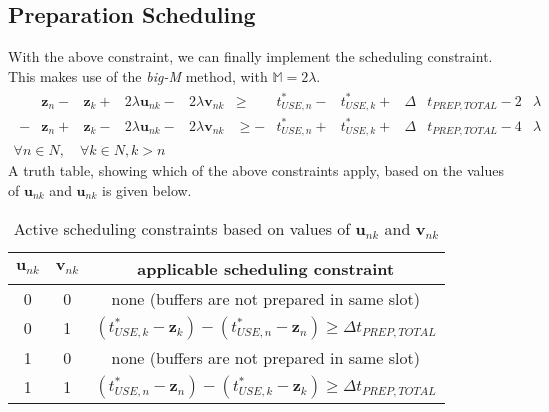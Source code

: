\subsection{Preparation Scheduling}\label{SS.constr9}
With the above constraint, we can finally implement the scheduling constraint.
This makes use of the \emph{big-M} method, with $\mathbb{M} = 2 \lambda$.
\begin{equation}
    \begin{split}
        \begin{alignedat}{10}
            &\boldsymbol{z}_{n} {}-{} &\boldsymbol{z}_{k} {}+{} &2 \lambda
            \boldsymbol{u}_{nk} {}-{} &2 \lambda \boldsymbol{v}_{nk} &\ge
            &t_{USE,n}^{*} {}-{} &t_{USE,k}^{*} {}+{}
            &\Delta &t_{PREP,TOTAL} {}-{} 2 &\lambda\\
            - &\boldsymbol{z}_{n} {}+{} &\boldsymbol{z}_{k} {}-{} &2 \lambda
            \boldsymbol{u}_{nk} {}-{} &2 \lambda \boldsymbol{v}_{nk} &\ge
            - &t_{USE,n}^{*} {}+{} &t_{USE,k}^{*} {}+{}
            &\Delta &t_{PREP,TOTAL} {}-{} 4 &\lambda
        \end{alignedat}
        \\\forall n \in N, \quad \forall k \in N, k > n
    \end{split}
    \label{eq.constr9}
\end{equation}
A truth table, showing which of the above constraints apply, based on the
values of $\boldsymbol{u}_{nk}$ and $\boldsymbol{u}_{nk}$ is given below.
\begin{table}[h!]
    \centering
    \caption{Active scheduling constraints based on values of 
             $\boldsymbol{u}_{nk}$ and $\boldsymbol{v}_{nk}$}
    \label{tbl.truthw}
    \begin{tabular}{c c | c}
        $\boldsymbol{u}_{nk}$ & $\boldsymbol{v}_{nk}$
        & applicable scheduling constraint\\ \hline
        0 & 0 & none (buffers are not prepared in same slot)\\
        0 & 1 & $\left( t_{USE,k}^{*} - \boldsymbol{z}_{k} \right)
            - \left( t_{USE,n}^{*} - \boldsymbol{z}_{n} \right)
            \ge \Delta t_{PREP,TOTAL}$\\
        1 & 0 & none (buffers are not prepared in same slot)  \\
        1 & 1 & $\left( t_{USE,n}^{*} - \boldsymbol{z}_{n} \right)
            - \left( t_{USE,k}^{*} - \boldsymbol{z}_{k} \right)
            \ge \Delta t_{PREP,TOTAL}$\\
    \end{tabular}
\end{table}

